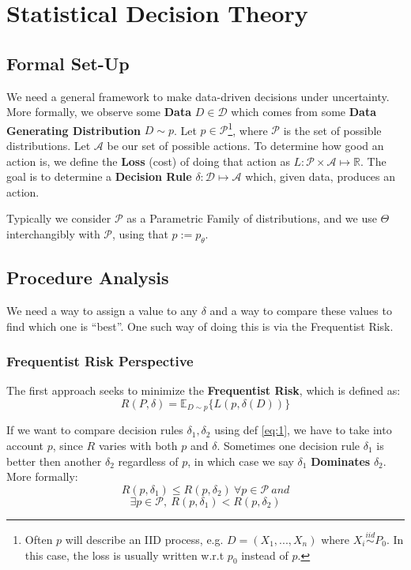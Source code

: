 \documentclass[]{article}
\theoremstyle{mattstyle}
\theoremstyle{definition}
\begin{document}
\section{Statistical Decision Theory}

\subsection{Formal Set-Up}

We need a general framework to make data-driven decisions under uncertainty. More formally, we observe some \textbf{Data} \(D \in \mathcal{D}\) which comes from some \textbf{Data Generating Distribution} \(D \sim p\). Let \(p\in \mathcal{P}\)\footnote{Often $p$ will describe an IID process, e.g. $D = (X_1,...,X_n)$ where $X_i \overset{iid}\sim P_0$. In this case, the loss is usually written w.r.t $p_0$ instead of $p$.}, where \(\mathcal{P}\) is the set of possible distributions. Let \(\mathcal{A}\) be our set of possible actions. To determine how good an action is, we define the \textbf{Loss} (cost) of doing that action as \(L: \mathcal{P} \times \mathcal{A} \mapsto \mathbb{R}\). The goal is to determine a \textbf{Decision Rule} \(\delta: \mathcal{D} \mapsto \mathcal{A}\) which, given data, produces an action.

Typically we consider \(\mathcal{P}\) as a Parametric Family of distributions, and we use \(\Theta\) interchangibly with \(\mathcal{P}\), using that \(p := p_{\theta}\).

\subsection{Procedure Analysis}

We need a way to assign a value to any \(\delta\) and a way to compare these values to find which one is ``best''. One such way of doing this is via the Frequentist Risk.

\subsubsection{Frequentist Risk Perspective} 
The first approach seeks to minimize the \textbf{Frequentist Risk}, which is defined as:
\begin{equation}\label{eq:1}
	R(P,\delta)=\mathbb{E}_{D\sim p}\{L(p,\delta(D))\}
\end{equation}

If we want to compare decision rules \(\delta_1, \delta_2\) using def \ref{eq:1}, we have to take into account \(p\), since \(R\) varies with both \(p\) and \(\delta\). Sometimes one decision rule \(\delta_1\) is better then another \(\delta_2\) regardless of \(p\), in which case we say \(\delta_1\) \textbf{Dominates} \(\delta_2\).
More formally:
$$R(p,\delta_1)\leq R(p,\delta_2) \ \forall p \in \mathcal{P}\ and$$
$$\exists p \in \mathcal{P},\ R(p,\delta_1) < R(p, \delta_2)$$
\end{document}
